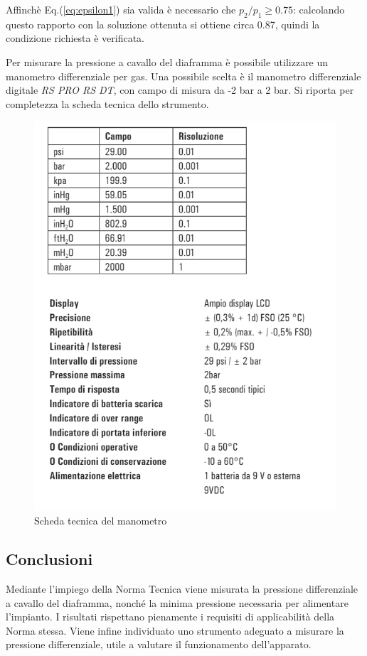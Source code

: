 Affinchè Eq.(\ref{eq:epsilon1}) sia valida è necessario che $p_2/p_1 \geqslant 0.75 $: calcolando questo rapporto con la soluzione ottenuta si ottiene circa 0.87, quindi la condizione richiesta è verificata.

Per misurare la pressione a cavallo del diaframma è possibile utilizzare un manometro differenziale per gas. Una possibile scelta è il manometro differenziale digitale \textit{RS PRO RS DT}, con campo di misura da -2 bar a 2 bar. Si riporta per completezza la scheda tecnica dello strumento.
\begin{figure} [H]
	\centering
	\includegraphics[width=0.4\linewidth]{chapters/3-misuradiaframma/scheda}
	\caption{Scheda tecnica del manometro}
	\label{fig:scheda}
\end{figure}

\subsection{Conclusioni}
Mediante l'impiego della Norma Tecnica viene misurata la pressione differenziale a cavallo del diaframma, nonché la minima pressione necessaria per alimentare l'impianto. I risultati rispettano pienamente i requisiti di applicabilità della Norma stessa. Viene infine individuato uno strumento adeguato a misurare la pressione differenziale, utile a valutare il funzionamento dell'apparato.
